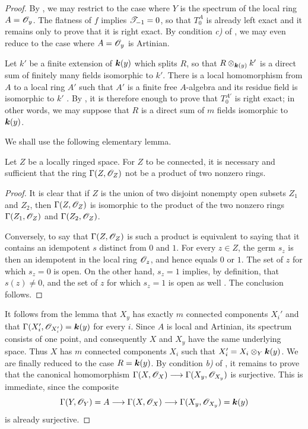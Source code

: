 \begin{proof}
By , we may restrict to the case where
$Y$ is the spectrum of the local ring $A=\mathscr{O}_y$.
The flatness of $f$ implies $\mathscr{T}_{-1}=0$, so that
$T_0^A$ is already left exact and it remains only to prove
that it is right exact.  By condition \emph{c)} of
, we may even reduce to the case where
$A=\mathscr{O}_y$ is Artinian.

Let $k'$ be a finite extension of $\boldsymbol{k}(y)$ which splits
$R$, so that $R\otimes_{\boldsymbol{k}(y)}k'$
is a direct sum of finitely many fields isomorphic to $k'$.
There is a local homomorphism from $A$ to a local ring
$A'$ such that $A'$ is a finite free $A$-algebra and its
residue field is isomorphic to $k'$ .
By , it is therefore enough to prove that
$T_0^{A'}$ is right exact; in other words, we may suppose
that $R$ is a direct sum of $m$ fields isomorphic to
$\boldsymbol{k}(y)$.

We shall use the following elementary lemma.

\begin{lemma}[7.8.6.1]
\label{III.7.8.6.1}
Let $Z$ be a locally ringed space.  For $Z$ to be connected,
it is necessary and sufficient that the ring
$\Gamma(Z,\mathscr{O}_Z)$ not be a product of two nonzero rings.
\end{lemma}

\begin{proof}
It is clear that if $Z$ is the union of two disjoint
nonempty open subsets $Z_1$ and $Z_2$, then
$\Gamma(Z,\mathscr{O}_Z)$ is isomorphic to the product of the
two nonzero rings $\Gamma(Z_1,\mathscr{O}_Z)$ and
$\Gamma(Z_2,\mathscr{O}_Z)$.

Conversely, to say that $\Gamma(Z,\mathscr{O}_Z)$ is such a
product is equivalent to saying that it contains an
idempotent $s$ distinct from $0$ and $1$.  For every
$z\in Z$, the germ $s_z$ is then an idempotent in the local
ring $\mathscr{O}_z$, and hence equals $0$ or $1$.  The set of
$z$ for which $s_z=0$ is open.  On the other hand,
$s_z=1$ implies, by definition, that $s(z)\ne0$, and the
set of $z$ for which $s_z=1$ is open as well
.  The conclusion follows.
\end{proof}

It follows from the lemma that $X_y$ has exactly $m$
connected components $X_i'$ and that $\Gamma(X_i',\mathscr{O}_{X_i'})=\boldsymbol{k}(y)$
for every $i$.  Since $A$ is local and Artinian, its
spectrum consists of one point, and consequently $X$ and
$X_y$ have the same underlying space.  Thus $X$ has $m$
connected components $X_i$ such that $X_i'=X_i\otimes_Y\boldsymbol{k}(y)$.
We are finally reduced to the case $R=\boldsymbol{k}(y)$.  By
condition \emph{b)} of , it remains to prove that
the canonical homomorphism $\Gamma(X,\mathscr{O}_X)\longrightarrow
\Gamma(X_y,\mathscr{O}_{X_y})$
is surjective.  This is immediate, since the composite
\[
  \Gamma(Y,\mathscr{O}_Y)=A
  \longrightarrow\Gamma(X,\mathscr{O}_X)
  \longrightarrow\Gamma(X_y,\mathscr{O}_{X_y})=\boldsymbol{k}(y)
\]
is already surjective.
\end{proof}


